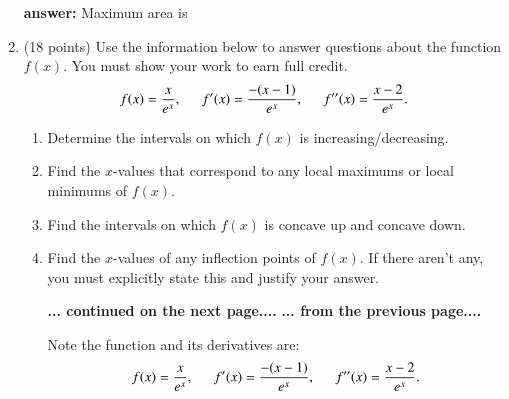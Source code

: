 \documentclass[12pt]{article}
\begin{document}
\begin{enumerate}
\def\xx{1}
\hfill

\textbf{answer:} Maximum area is \underline{\hspace{2in}}


\newpage
\item (18 points) Use the information below to answer questions about the function $f(x).$ You must show your work to earn full credit. \\
$$f(x)=\frac{x}{e^x}, \hspace{.2in} f'(x)=\frac{-(x-1)}{e^x},
\hspace{.2in} f''(x)=\frac{x-2}{e^x}.$$

\begin{enumerate}
\item  Determine the intervals on which $f(x)$ is increasing/decreasing.
\vfill
\item Find the $x$-values that correspond to any local maximums or local minimums of $f(x)$. 
\vspace{1in}
\item Find the intervals on which $f(x)$ is concave up and concave down.
\vfill 
\item Find the $x$-values of any inflection points of $f(x).$ If there aren't any, you must explicitly state this and justify your answer.\\

\vspace{1in}

\hfill \textbf{... continued on the next page....}
\newpage
\textbf{... from the previous page....}

Note the function and its derivatives are: 
$$f(x)=\frac{x}{e^x}, \hspace{.2in} f'(x)=\frac{-(x-1)}{e^x},
\hspace{.2in} f''(x)=\frac{x-2}{e^x}.$$



\end{enumerate}
\end{enumerate}
\end{document}
